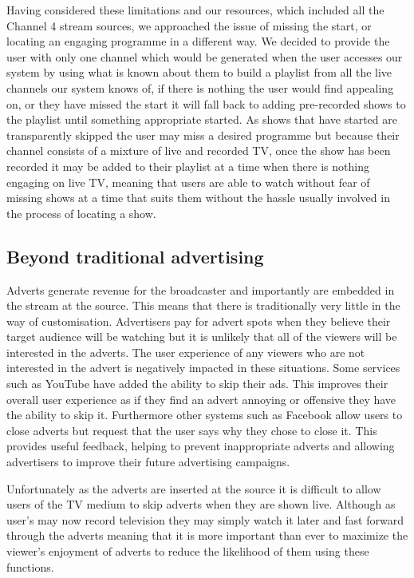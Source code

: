 	Having considered these limitations and our resources, which included all the Channel 4 stream sources, we approached the issue of missing the start, or locating an engaging programme in a different way. We decided to provide the user with only one channel which would be generated when the user accesses our system by using what is known about them to build a playlist from all the live channels our system knows of, if there is nothing the user would find appealing on, or they have missed the start it will fall back to adding pre-recorded shows to the playlist until something appropriate started. As shows that have started are transparently skipped the user may miss a desired programme but because their channel consists of a mixture of live and recorded TV, once the show has been recorded it may be added to their playlist at a time when there is nothing engaging on live TV, meaning that users are able to watch without fear of missing shows at a time that suits them without the hassle usually involved in the process of locating a show.

\subsection{Beyond traditional advertising}
	Adverts generate revenue for the broadcaster and importantly are embedded in the stream at the source. This means that there is traditionally very little in the way of customisation. Advertisers pay for advert spots when they believe their target audience will be watching but it is unlikely that all of the viewers will be interested in the adverts. The user experience of any viewers who are not interested in the advert is negatively impacted in these situations. Some services such as YouTube have added the ability to skip their ads. This improves their overall user experience as if they find an advert annoying or offensive they have the ability to skip it. Furthermore other systems such as Facebook allow users to close adverts but request that the user says why they chose to close it. This provides useful feedback, helping to prevent inappropriate adverts and allowing advertisers to improve their future advertising campaigns.

	Unfortunately as the adverts are inserted at the source it is difficult to allow users of the TV medium to skip adverts when they are shown live. Although as user's may now record television they may simply watch it later and fast forward through the adverts meaning that it is more important than ever to maximize the viewer's enjoyment of adverts to reduce the likelihood of them using these functions.

